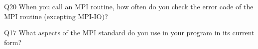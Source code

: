 \begin{description}%
\item{Q20} When you call an MPI routine, how often do you check the error code of the MPI routine  (excepting MPI-IO)?%
\item{Q17} What aspects of the MPI standard do you use in your program in its current form?%
\end{description}%
